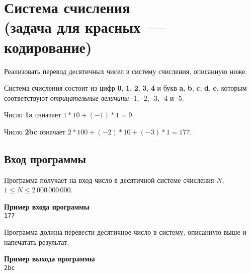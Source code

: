 \documentclass[a4paper,10pt]{article}
\begin{document}
\section*{Система счисления\\
(задача для красных~--- кодирование)}

Реализовать перевод десятичных чисел в систему счисления, описанную ниже.

Система счисления состоит из цифр \textbf{0}, \textbf{1}, \textbf{2}, \textbf{3}, \textbf{4} и букв \textbf{a}, \textbf{b}, \textbf{c}, \textbf{d}, \textbf{e}, которым соответствуют \textit{отрицательные величины} -1, -2, -3, -4 и -5.

Число \textbf{1a} означает $1 * 10 + (-1) * 1 = 9$.

Число \textbf{2bc} означает $2 * 100 + (-2) * 10 + (-3) * 1 = 177$. 

\subsection*{Вход программы}

Программа получает на вход число в десятичной системе счисления $N$, $1 \leq N \leq 2\,000\,000\,000$.

\noindent\textbf{Пример входа программы}\\
\texttt{177}

Программа должна перевести десятичное число в систему, описанную выше и напечатать результат.

\noindent\textbf{Пример выхода программы}\\
\texttt{2bc}
\end{document}
